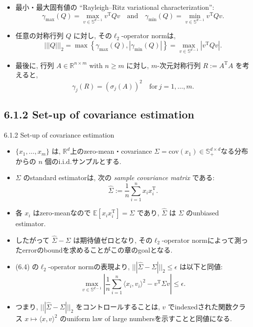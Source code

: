 \documentclass[unicode,aspectratio=169,11pt]{beamer}
\newcommand{\ex}{\mathbb{E}}
\newcommand{\cov}{\mathrm{cov}}
\newcommand{\bb}{\mathbb}
\newcommand{\tr}{\mathrm{T}}
\begin{document}
\begin{frame}{}{}
  \begin{itemize}
    \item 最小・最大固有値の ``Rayleigh–Ritz variational characterization'':
    \[
        \gamma_{\max}(Q) = \max_{v \in \bb{S}^{d-1}} v^\tr Q v
        \quad \mathrm{and} \quad
        \gamma_{\min}(Q) = \min_{v \in \bb{S}^{d-1}} v^\tr Q v. \tag{6.3}
    \]
    \item 任意の対称行列 $Q$ に対し, その$\ell_2$-operator normは, 
    \[ |||Q|||_2 = \max \left\{ \gamma_{\max}(Q), |\gamma_{\min}(Q)| \right\} = \max_{v \in \bb{S}^{d-1}}\left|v^\tr Qv\right|.\tag{6.4} \]
    \item 最後に, 行列 $A \in \bb{R}^{n\times m}$ with $n \ge m$ に対し, $m$-次元対称行列 $R := A^\tr A$ を考えると, 
    \[ \gamma_j(R) = \left(\sigma_j(A)\right)^2 \quad \mathrm{for}\ j = 1, \dots, m. \]
  \end{itemize}
\end{frame}

\subsection{6.1.2 Set-up of covariance estimation}
\begin{frame}{6.1.2 Set-up of covariance estimation}{}
  \begin{itemize}
    \item $\{x_1,\dots,x_m\}$ は, $\bb{R}^d$上のzero-mean・covariance $\Sigma = \cov(x_1) \in \bb{S}_+^{d\times d}$なる分布からの $n$ 個のi.i.d.サンプルとする.
    \item $\Sigma$ のstandard estimatorは, 次の {\it sample covariance matrix} である:
    \[ \widehat{\Sigma} := \frac{1}{n}\sum_{i=1}^n x_i x_i^\tr.  \tag{6.5} \]
    \item 各 $x_i$ はzero-meanなので $\ex[x_i x_i^\tr] = \Sigma$ であり, $\widehat{\Sigma}$ は $\Sigma$ のunbiased estimator.
    \item したがって $\widehat{\Sigma}-\Sigma$ は期待値ゼロとなり, その$\ell_2$-operator normによって測ったerrorのboundを求めることがこの章のgoalとなる.
  \end{itemize}
\end{frame}

\begin{frame}
  \begin{itemize}
    \item (6.4) の$\ell_2$-operator normの表現より, $|||\widehat{\Sigma}-\Sigma|||_2 \le \epsilon$ は以下と同値:
    \[ \max_{v \in \bb{S}^{d-1}} \left|\frac{1}{n}\sum_{i=1}^n \langle x_i,v_i \rangle^2 - v^\tr \Sigma v\right| \le \epsilon. \tag{6.6}\]
    \item つまり, $|||\widehat{\Sigma} - \Sigma|||_2$ をコントロールすることは, $v$ でindexedされた関数クラス $x \mapsto \langle x, v\rangle^2$ のuniform law of large numbersを示すことと同値になる.
  \end{itemize}
\end{frame}
\end{document}
